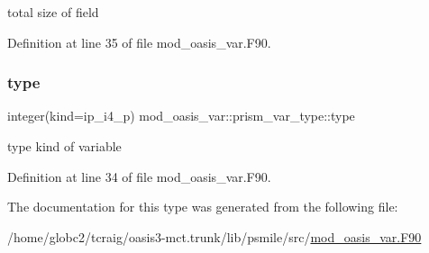 total size of field 



Definition at line 35 of file mod\+\_\+oasis\+\_\+var.\+F90.

\mbox{\label{structmod__oasis__var_1_1prism__var__type_a944549d5fb1aebecc59ca5dbff9b3222}} 
\subsubsection{\texorpdfstring{type}{type}}
{\footnotesize\ttfamily integer(kind=ip\+\_\+i4\+\_\+p) mod\+\_\+oasis\+\_\+var\+::prism\+\_\+var\+\_\+type\+::type\hspace{0.3cm}{\ttfamily [private]}}



type kind of variable 



Definition at line 34 of file mod\+\_\+oasis\+\_\+var.\+F90.



The documentation for this type was generated from the following file\+:\begin{DoxyCompactItemize}
\item 
/home/globc2/tcraig/oasis3-\/mct.\+trunk/lib/psmile/src/\hyperlink{mod__oasis__var_8_f90}{mod\+\_\+oasis\+\_\+var.\+F90}\end{DoxyCompactItemize}
